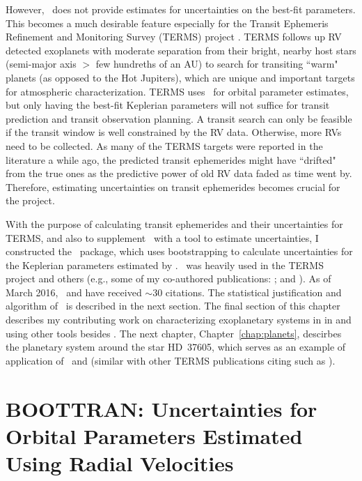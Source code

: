 However, \rvlin\ does not provide estimates for uncertainties on
the best-fit parameters. This becomes a much desirable feature
especially for the Transit Ephemeris Refinement and Monitoring Survey
(TERMS) project \citep{Kane2009}. TERMS follows up RV detected
exoplanets with moderate separation from their bright, nearby host
stars (semi-major axis $>$ few hundreths of an AU) to search for
transiting ``warm" planets (as opposed to the Hot Jupiters), which are
unique and important targets for atmospheric characterization. TERMS
uses \rvlin\ for orbital parameter estimates, but only having the
best-fit Keplerian parameters will not suffice for transit prediction
and transit observation planning. A transit search can only be
feasible if the transit window is well constrained by the RV
data. Otherwise, more RVs need to be collected. As many of the TERMS
targets were reported in the literature a while ago, the predicted
transit ephemerides might have ``drifted" from the true ones as the
predictive power of old RV data faded as time went by. Therefore,
estimating uncertainties on transit ephemerides becomes crucial for
the project.

With the purpose of calculating transit ephemerides and their
uncertainties for TERMS, and also to supplement \rvlin\ with a tool to
estimate uncertainties, I constructed the \boottran\ package, which
uses bootstrapping to calculate uncertainties for the Keplerian
parameters estimated by \rvlin. \boottran\ was heavily used in the
TERMS project and others (e.g., some of my co-authored publications:
\citealt{2013ApJ...768..155H, 2012ApJ...754...37D,
  2011ApJ...737...58K, 2011ApJ...735L..41K}; and
\citealt{2015ApJ...800...22F}). As of March 2016, \boottran\ and
\cite{wang2012} have received $\sim$30 citations. The statistical
justification and algorithm of \boottran\ is described in the next
section. The final section of this chapter describes my contributing
work on characterizing exoplanetary systems in in
\cite{2015ApJ...800...22F} and \cite{2013ApJ...768..155H} using other
tools besides \boottran. The next chapter, Chapter~\ref{chap:planets},
descirbes the planetary system around the star HD~37605, which serves
as an example of application of \rvlin\ and \boottran (similar with
other TERMS publications citing \citealt{wang2012} such as
\citealt{2012ApJ...754...37D}).


\section{BOOTTRAN: Uncertainties for Orbital Parameters Estimated
  Using Radial Velocities}\label{boottran:sec:boottran}

